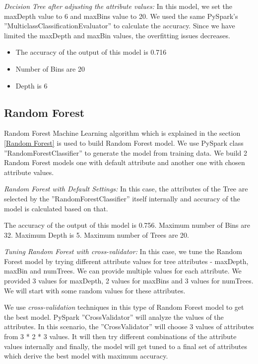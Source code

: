 \documentclass[sigconf]{acmart}
\begin{document}
\textit{Decision Tree after adjusting the attribute values:} In this model, we set the maxDepth value to 6 and maxBins value to 20. We used the same PySpark's ''MulticlassClassificationEvaluator'' to calculate the accuracy. Since we have limited the maxDepth and maxBin values, the overfitting issues decreases.

\begin{itemize}
   \item The accuracy of the output of this model is 0.716
   \item Number of Bins are 20
   \item Depth is 6
\end{itemize}

\subsection{Random Forest}

Random Forest Machine Learning algorithm which is explained in the section \ref{Random Forest} is used to build Random Forest model. We use PySpark class ''RandomForestClassifier'' to generate the model from training data. We build 2 Random Forest models one with default attribute and another one with chosen attribute values. 

\textit{Random Forest with Default Settings:} In this case, the attributes of the Tree are selected by the ''RandomForestClassifier'' itself internally and accuracy of the model is calculated based on that.

The accuracy of the output of this model is 0.756. Maximum number of Bins are 32. Maximum Depth is 5. Maximum number of Trees are 20.


\textit{Tuning Random Forest with cross-validator:} In this case, we tune the Random Forest model by trying different attribute values for tree attributes - maxDepth, maxBin and numTrees. We can provide multiple values for each attribute. We provided 3 values for maxDepth, 2 values for maxBins and 3 values for numTrees. We will start with some random values for these attributes. 

We use \emph{cross-validation} techniques in this type of Random Forest model to get the best model. PySpark ''CrossValidator'' will analyze the values of the attributes. In this scenario, the ''CrossValidator'' will choose 3 values of attributes from 3 * 2 * 3 values. It will then try different combinations of the attribute values internally and finally, the model will get tuned to a final set of attributes which derive the best model with maximum accuracy. 
\end{document}
